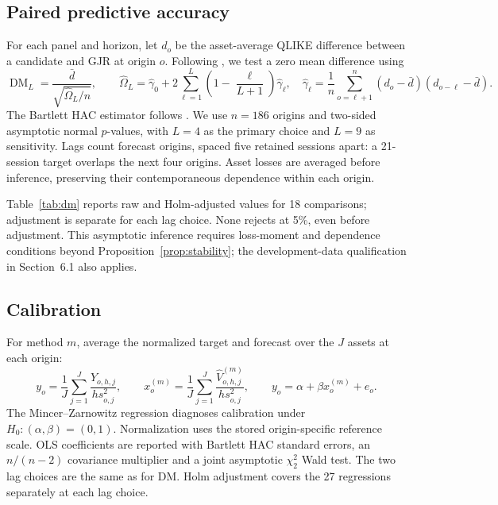 \documentclass[12pt,a4paper]{article}
\begin{document}
\subsection{Paired predictive accuracy}
For each panel and horizon, let $d_o$ be the asset-average QLIKE difference
between a candidate and GJR at origin $o$. Following \citet{diebold1995},
we test a zero mean difference using
\[
\operatorname{DM}_L=\frac{\bar d}{\sqrt{\widehat\Omega_L/n}},\qquad
\widehat\Omega_L=\widehat\gamma_0+
2\sum_{\ell=1}^{L}\left(1-\frac{\ell}{L+1}\right)\widehat\gamma_\ell,
\quad
\widehat\gamma_\ell=\frac1n\sum_{o=\ell+1}^{n}
(d_o-\bar d)(d_{o-\ell}-\bar d).
\]
The Bartlett HAC estimator follows \citet{newey1987}. We use $n=186$ origins
and two-sided asymptotic normal $p$-values, with $L=4$ as the primary choice
and $L=9$ as sensitivity. Lags count forecast origins, spaced five retained
sessions apart: a 21-session target overlaps the next four origins.
Asset losses are averaged before inference, preserving their contemporaneous
dependence within each origin.

Table~\ref{tab:dm} reports raw and Holm-adjusted \citep{holm1979} values for
18 comparisons; adjustment is separate for each lag choice. None rejects at
5\%, even before adjustment. This asymptotic inference requires loss-moment
and dependence conditions beyond Proposition~\ref{prop:stability}; the
development-data qualification in Section~6.1 also applies.

\begin{table}[htbp]
\centering\footnotesize\setlength{\tabcolsep}{4pt}

\caption{Post-hoc predictive-accuracy diagnostics against GJR. Negative
$\Delta$ favors the named model. DM uses $L=4$; $p_4$ and $p_9$ use the
indicated HAC lag lengths. Holm $p_4$ adjusts all 18 primary comparisons.
Values are rounded only for display.}
\label{tab:dm}
\end{table}

\subsection{Calibration}
For method $m$, average the normalized target and forecast over the $J$
assets at each origin:
\[
y_o=\frac1J\sum_{j=1}^{J}\frac{Y_{o,h,j}}{h s_{o,j}^2},\qquad
x_o^{(m)}=\frac1J\sum_{j=1}^{J}
\frac{\widehat V_{o,h,j}^{(m)}}{h s_{o,j}^2},\qquad
y_o=\alpha+\beta x_o^{(m)}+e_o.
\]
The Mincer--Zarnowitz regression \citep{mincer1969,patton2009} diagnoses
calibration under $H_0:(\alpha,\beta)=(0,1)$. Normalization uses the stored
origin-specific reference scale. OLS coefficients are reported with Bartlett
HAC standard errors, an $n/(n-2)$ covariance multiplier and a joint
asymptotic $\chi^2_2$ Wald test. The two lag choices are the same as for DM.
Holm adjustment covers the 27 regressions separately at each lag choice.
\end{document}
